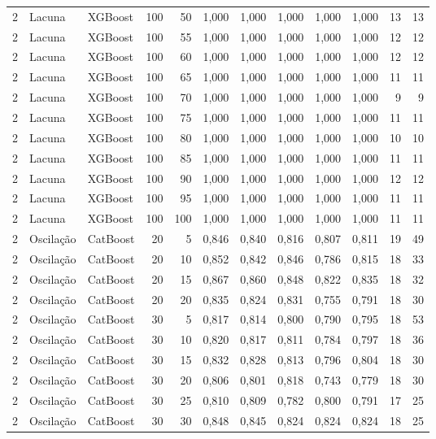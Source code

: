 \begin{longtable}{@{}rllrrrrrrrrr@{}}
2 & Lacuna & XGBoost & 100 & 50 & 1,000 & 1,000 & 1,000 & 1,000 & 1,000 & 13 & 13 \\
2 & Lacuna & XGBoost & 100 & 55 & 1,000 & 1,000 & 1,000 & 1,000 & 1,000 & 12 & 12 \\
2 & Lacuna & XGBoost & 100 & 60 & 1,000 & 1,000 & 1,000 & 1,000 & 1,000 & 12 & 12 \\
2 & Lacuna & XGBoost & 100 & 65 & 1,000 & 1,000 & 1,000 & 1,000 & 1,000 & 11 & 11 \\
2 & Lacuna & XGBoost & 100 & 70 & 1,000 & 1,000 & 1,000 & 1,000 & 1,000 & 9 & 9 \\
2 & Lacuna & XGBoost & 100 & 75 & 1,000 & 1,000 & 1,000 & 1,000 & 1,000 & 11 & 11 \\
2 & Lacuna & XGBoost & 100 & 80 & 1,000 & 1,000 & 1,000 & 1,000 & 1,000 & 10 & 10 \\
2 & Lacuna & XGBoost & 100 & 85 & 1,000 & 1,000 & 1,000 & 1,000 & 1,000 & 11 & 11 \\
2 & Lacuna & XGBoost & 100 & 90 & 1,000 & 1,000 & 1,000 & 1,000 & 1,000 & 12 & 12 \\
2 & Lacuna & XGBoost & 100 & 95 & 1,000 & 1,000 & 1,000 & 1,000 & 1,000 & 11 & 11 \\
2 & Lacuna & XGBoost & 100 & 100 & 1,000 & 1,000 & 1,000 & 1,000 & 1,000 & 11 & 11 \\
2 & Oscilação & CatBoost & 20 & 5 & 0,846 & 0,840 & 0,816 & 0,807 & 0,811 & 19 & 49 \\
2 & Oscilação & CatBoost & 20 & 10 & 0,852 & 0,842 & 0,846 & 0,786 & 0,815 & 18 & 33 \\
2 & Oscilação & CatBoost & 20 & 15 & 0,867 & 0,860 & 0,848 & 0,822 & 0,835 & 18 & 32 \\
2 & Oscilação & CatBoost & 20 & 20 & 0,835 & 0,824 & 0,831 & 0,755 & 0,791 & 18 & 30 \\
2 & Oscilação & CatBoost & 30 & 5 & 0,817 & 0,814 & 0,800 & 0,790 & 0,795 & 18 & 53 \\
2 & Oscilação & CatBoost & 30 & 10 & 0,820 & 0,817 & 0,811 & 0,784 & 0,797 & 18 & 36 \\
2 & Oscilação & CatBoost & 30 & 15 & 0,832 & 0,828 & 0,813 & 0,796 & 0,804 & 18 & 30 \\
2 & Oscilação & CatBoost & 30 & 20 & 0,806 & 0,801 & 0,818 & 0,743 & 0,779 & 18 & 30 \\
2 & Oscilação & CatBoost & 30 & 25 & 0,810 & 0,809 & 0,782 & 0,800 & 0,791 & 17 & 25 \\
2 & Oscilação & CatBoost & 30 & 30 & 0,848 & 0,845 & 0,824 & 0,824 & 0,824 & 18 & 25 \\

\end{longtable}
